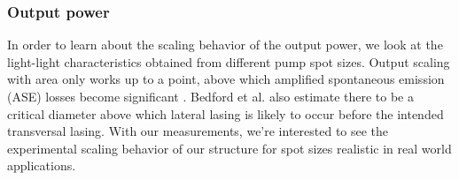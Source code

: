 \subsubsection{Output power}
\label{sec:eval:pumpspot:pwr}

In order to learn
about the scaling behavior
of the output power,
we look 
at the light-light characteristics
obtained from different
pump spot sizes.
Output scaling with area
only works up to a point,
above which
amplified spontaneous emission (ASE) losses
become significant
\cite{Hessenius2011}.
Bedford et al. \cite{Bedford2005}
also estimate
there to be
a critical diameter
above which lateral lasing
is likely to occur
before the intended
transversal lasing.
With our measurements,
we're interested
to see the experimental
scaling behavior
of our structure
for spot sizes
realistic in real world applications.

